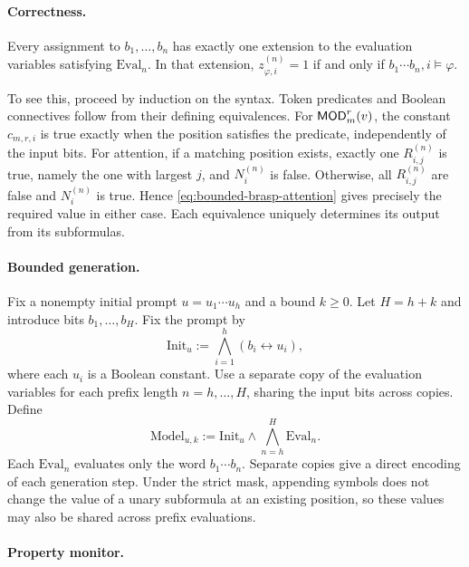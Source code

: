 \documentclass[acmsmall,screen,review,anonymous,nonacm]{PLDI/acmart}
\begin{document}
\paragraph{Correctness.}
Every assignment to $b_1,\ldots,b_n$ has exactly one extension to the
evaluation variables satisfying $\mathrm{Eval}_n$. In that extension,
$z^{(n)}_{\varphi,i}=1$ if and only if
$b_1\cdots b_n,i\models\varphi$.

To see this, proceed by induction on the syntax. Token predicates
and Boolean connectives follow from their defining equivalences.
For $\mathsf{MOD}_m^r(v)$, the constant $c_{m,r,i}$ is true exactly when the
position satisfies the predicate, independently of the input bits.
For attention,
if a matching position exists, exactly one $R^{(n)}_{i,j}$ is true,
namely the one with largest $j$, and $N^{(n)}_i$ is false. Otherwise,
all $R^{(n)}_{i,j}$ are false and $N^{(n)}_i$ is true. Hence
\eqref{eq:bounded-brasp-attention} gives precisely the required value in either case.
Each equivalence uniquely determines its output from its subformulas.


\paragraph{Bounded generation.}

Fix a nonempty initial prompt $u=u_1\cdots u_h$ and a bound $k\geq0$.
Let $H=h+k$ and introduce bits $b_1,\ldots,b_H$. Fix the prompt by
\[
\mathrm{Init}_u:=\bigwedge_{i=1}^{h}(b_i\leftrightarrow u_i),
\]
where each $u_i$ is a Boolean constant. Use a separate copy of the
evaluation variables for each prefix length $n=h,\ldots,H$, sharing
the input bits across copies. Define
\[
\mathrm{Model}_{u,k}:=
\mathrm{Init}_u\wedge\bigwedge_{n=h}^{H}\mathrm{Eval}_n.
\]
Each $\mathrm{Eval}_n$ evaluates only the word $b_1\cdots b_n$. Separate
copies give a direct encoding of each generation step. Under the
strict mask, appending symbols does not change the value of a unary
subformula at an existing position, so these values may also be shared
across prefix evaluations.

\paragraph{Property monitor.}
\end{document}
